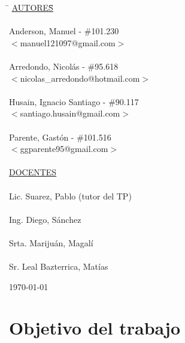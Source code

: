 \begin{titlepage}
		\begin{tabbing}
			\hspace{2cm}\=\+
			\underline{AUTORES}\hspace{-1cm}\=\+\hspace{1cm}\=\hspace{6cm}\=\\
			\\
			Anderson, Manuel			\>\>- \#101.230\\
			\>\footnotesize{$<$manuel121097@gmail.com$>$}\\
			\\
			Arredondo, Nicolás			\>\>- \#95.618\\
			\>\footnotesize{$<$nicolas\_arredondo@hotmail.com$>$}\\
			\\
			Husain, Ignacio Santiago	\>\>- \#90.117\\
			\>\footnotesize{$<$santiago.husain@gmail.com$>$}\\
			\\
			Parente, Gastón			 	\>\>- \#101.516 \\
			\>\footnotesize{$<$ggparente95@gmail.com$>$}\\
			\\
			\<\underline{DOCENTES}\\
			\\
			Lic. Suarez, Pablo (tutor del TP)\\
			\\
			Ing. Diego, Sánchez \\
			\\
			Srta. Marijuán, Magalí\\
			\\
			Sr. Leal Bazterrica, Matías
		\end{tabbing}
		
		
		\today
		
	\end{titlepage}
	
	\clearpage
	\tableofcontents
	\clearpage
	\section{Objetivo del trabajo}
	
